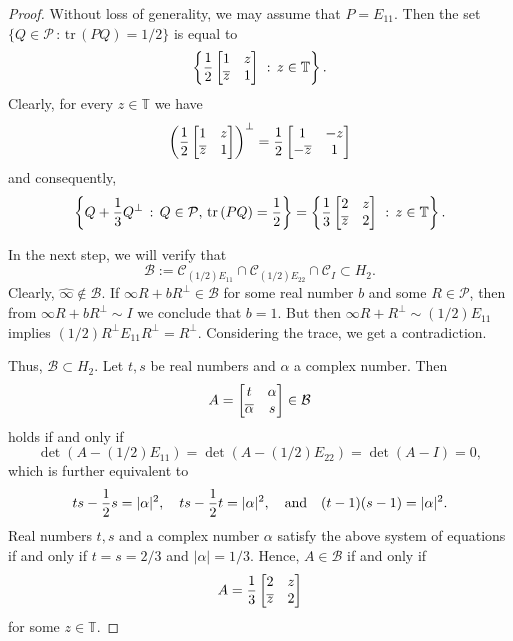 \documentclass[10pt,a4paper]{amsart}
\newcommand\oi{{\widehat{\infty}}}
\theoremstyle{definition}
\theoremstyle{remark}
\numberwithin{subsection}{section}
\numberwithin{equation}{section}
\begin{document}
\begin{proof}
Without loss of generality, we may assume that $P= E_{11}$. Then the set $\{ Q\in \mathcal{P} \, : \, \mathrm{tr}\, (PQ) = 1/2 \}$ is equal to
\[
\left\{ {1\over 2}\left[ \begin{matrix} {1} &  z \cr   \overline{z} &  {1}  \cr\end{matrix} \right] \ : \, z \in {\mathbb{T}} \right\}.
\]
Clearly, for every $z \in \mathbb{T}$ we have
\[
\left({1\over 2} \left[ \begin{matrix} {1} &  z \cr   \overline{z} &  {1}  \cr\end{matrix} \right] \right)^\perp =  {1\over 2} \left[ \begin{matrix} {1} &  - z \cr   -\overline{z} &  {1}  \cr\end{matrix} \right]
\]
and consequently, 
\[
 \left\{ Q + {1\over 3}Q^\perp \, : \, Q\in \mathcal{P}, \, \mathrm{tr}\, (PQ) = {1 \over 2} \right\} = 
\left\{ {1\over 3}\left[ \begin{matrix} {2} &   z \cr   \overline{z} &  {2}  \cr\end{matrix} \right] \ : \, z \in \mathbb{T} \right\} .
\]

In the next step, we will verify that 
\[
\mathcal{B} := \mathcal{C}_{(1/2)E_{11}} \cap \mathcal{C}_{{(1/2)}E_{22}} \cap \mathcal{C}_I\subset H_2.
\] Clearly, ${\oi}\not\in \mathcal{B}$. If $\infty R + bR^\perp \in \mathcal{B}$ for some real number $b$ and some $R \in \mathcal{P}$, then from 
$\infty R + bR^\perp  \sim I$ we conclude that $b=1$. But then  $\infty R + R^\perp  \sim (1/2)E_{11}$ implies $(1/2)R^\perp E_{11} R^\perp = R^\perp$. Considering the trace, we get 
a contradiction.

Thus, $\mathcal{B} \subset H_2$. 
Let $t,s$ be real numbers and $\alpha$ a complex number. 
Then 
\[
A =  
\left[ \begin{matrix}t &  \alpha \cr   \overline{\alpha} &  s  \cr\end{matrix} \right] \in \mathcal{B}
\]
holds if and only if 
\[
\det (A - (1/2)E_{11}) = \det (A - (1/2)E_{22}) = \det (A - I) = 0,
\]
which is further equivalent to
\[
ts - {1 \over 2}s = |\alpha|^2, \ \ \ ts - {1 \over 2}t = |\alpha|^2, \ \ \ \text{and} \ \ \ (t-1)(s-1)  = |\alpha|^2 .
\]
Real numbers $t,s$ and a complex number $\alpha$ satisfy the above system of equations if and only if $t=s= 2/3$ and $| \alpha | = 1/3$. Hence, $A \in \mathcal{B}$ if and only if
\[
A = {1\over 3}\left[ \begin{matrix} {2} &  z \cr   \overline{z} &  {2}  \cr\end{matrix} \right]
\] 
for some $z \in \mathbb{T}$.  
\end{proof}
\end{document}

